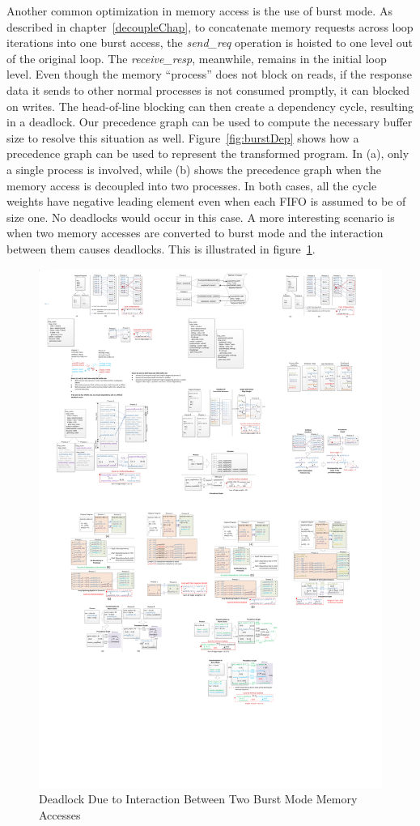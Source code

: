Another common optimization in memory access is the use of burst mode.
As described in chapter~\ref{decoupleChap}, to concatenate
memory requests across loop iterations into one burst access, the \textit{send\_req} operation is hoisted to one level out of the original loop. 
The \textit{receive\_resp}, meanwhile, remains in the initial loop level.
Even though the memory ``process'' does not block on reads, if the response data it sends to other normal processes is not consumed promptly, it can blocked on writes. 
The head-of-line blocking can then create a dependency cycle, resulting in a deadlock. Our precedence graph can be used to compute the necessary buffer size to resolve this situation as well. 
Figure~\ref{fig:burstDep} shows how a precedence graph can be used to represent the transformed program. In (a), only a single process is involved, while (b) shows
the precedence graph when the memory access is decoupled into two processes. In both cases, all the cycle weights have negative leading element even when each FIFO is assumed to be of size one. No deadlocks would occur in this case. A more interesting
scenario is when two memory accesses are converted to burst mode and the interaction
between them causes deadlocks. This is illustrated in figure~\ref{fig:burstDepCop}.


\begin{figure}[htp]
\begin{center}
\includegraphics[width=0.9\linewidth]{chap4fig/burstDepCoupling2.pdf}
\caption{Deadlock Due to Interaction Between Two Burst Mode Memory Accesses
\label{fig:burstDepCop}}
\end{center}
\end{figure}

